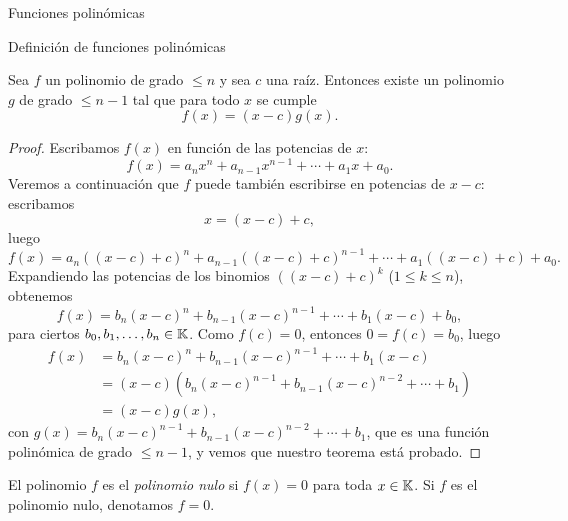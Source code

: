 \begin{chapter}{Funciones polinómicas}
\begin{section}{Definición de funciones polinómicas}
        \begin{teorema}\label{th-fact-raiz}
            Sea $f$ un polinomio de grado $\le n$ y sea $c$ una raíz. Entonces existe un polinomio $g$ de grado $\le n - 1$ tal que para todo $x$ se cumple
            \begin{equation*}
                f (x) = (x - c) g (x).
            \end{equation*}
        \end{teorema}
        \begin{proof} Escribamos $f(x)$ en función de las potencias de  $x$:
            \begin{equation*}
                f(x) = a_nx^n + a_{n-1}x^{n-1}+\cdots + a_1x +a_0.
            \end{equation*}
            Veremos a continuación que $f$ puede también escribirse en potencias de $x-c$: escribamos 
            \begin{equation*}
                x = (x-c)+ c,
            \end{equation*}
            luego 
            \begin{equation*}
            f(x) = a_n((x-c)+ c)^n + a_{n-1}((x-c)+ c)^{n-1}+\cdots + a_1((x-c)+ c) +a_0.
            \end{equation*}
            Expandiendo las potencias de los binomios $((x-c)+ c)^k$ ($1 \le k \le n$),  obtenemos
            \begin{equation*}
            f(x) = b_n(x-c)^n + b_{n-1}(x-c)^{n-1}+\cdots + b_1(x-c) +b_0,
            \end{equation*}
            para ciertos $b_0, b_1,\ldots ,b_n \in \mathbb K$. Como $f(c) = 0$,  entonces $0=f(c)=b_0$,  luego 
            \begin{align*}
                f(x) &= b_n(x-c)^n + b_{n-1}(x-c)^{n-1}+\cdots + b_1(x-c) \\
                &= (x-c)(b_n(x-c)^{n-1} + b_{n-1}(x-c)^{n-2}+\cdots + b_1) \\
                &=(x-c)g(x),
            \end{align*}
            con $g(x) =b_n(x-c)^{n-1} + b_{n-1}(x-c)^{n-2}+\cdots + b_1$,  que es una función polinómica de grado $\le n-1$, y vemos que nuestro teorema está probado.
        \end{proof}
            
        El polinomio $f$ es el \textit{polinomio nulo} si $f(x)=0$ para toda $x \in \mathbb K$. Si $f$ es el polinomio nulo,  denotamos $f =0$. 
            

\end{section}
\end{chapter}
